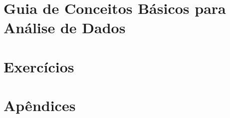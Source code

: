 \documentclass[12pt,a4paper,]{book}
\begin{document}



\tableofcontents


%



%


%
%
%
%
%

\part[Guia de Conceitos Básicos para Análise de Dados]{Guia de Conceitos Básicos para Análise de Dados}
\setcounter{chapter}{0}







%
%
%
%
%
%

\part{Exercícios}


%
%

\part{Apêndices}
\appendix 



%
%


\end{document}
